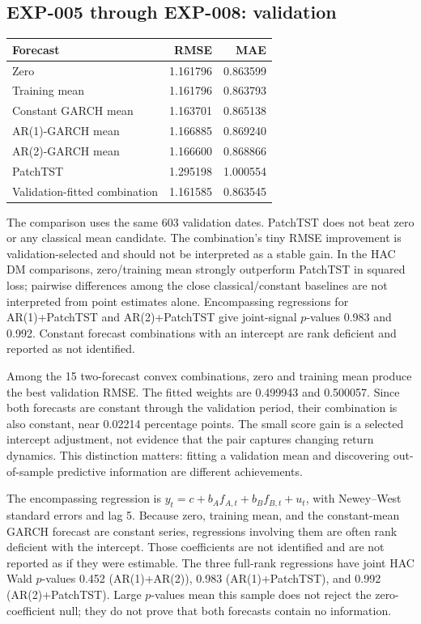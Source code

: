 \documentclass[11pt,a4paper]{article}
\begin{document}
\subsection{EXP-005 through EXP-008: validation}
\begin{center}
\begin{tabular}{lrr}
\toprule
Forecast & RMSE & MAE\\
\midrule
Zero & 1.161796 & 0.863599\\
Training mean & 1.161796 & 0.863793\\
Constant GARCH mean & 1.163701 & 0.865138\\
AR(1)-GARCH mean & 1.166885 & 0.869240\\
AR(2)-GARCH mean & 1.166600 & 0.868866\\
PatchTST & 1.295198 & 1.000554\\
Validation-fitted combination & 1.161585 & 0.863545\\
\bottomrule
\end{tabular}
\end{center}
The comparison uses the same 603 validation dates. PatchTST does not beat zero or any classical
mean candidate. The combination's tiny RMSE improvement is validation-selected and should not
be interpreted as a stable gain. In the HAC DM comparisons, zero/training mean strongly
outperform PatchTST in squared loss; pairwise differences among the close classical/constant
baselines are not interpreted from point estimates alone. Encompassing regressions for
AR(1)+PatchTST and AR(2)+PatchTST give joint-signal $p$-values 0.983 and 0.992. Constant forecast
combinations with an intercept are rank deficient and reported as not identified.

Among the 15 two-forecast convex combinations, zero and training mean produce the best
validation RMSE. The fitted weights are 0.499943 and 0.500057. Since both forecasts are
constant through the validation period, their combination is also constant, near 0.02214
percentage points. The small score gain is a selected intercept adjustment, not evidence that
the pair captures changing return dynamics. This distinction matters: fitting a validation mean
and discovering out-of-sample predictive information are different achievements.

The encompassing regression is
$y_t=c+b_Af_{A,t}+b_Bf_{B,t}+u_t$, with Newey--West standard errors and lag 5. Because zero,
training mean, and the constant-mean GARCH forecast are constant series, regressions involving
them are often rank deficient with the intercept. Those coefficients are not identified and are
not reported as if they were estimable. The three full-rank regressions have joint HAC Wald
$p$-values 0.452 (AR(1)+AR(2)), 0.983 (AR(1)+PatchTST), and 0.992 (AR(2)+PatchTST). Large
$p$-values mean this sample does not reject the zero-coefficient null; they do not prove that
both forecasts contain no information.
\end{document}
